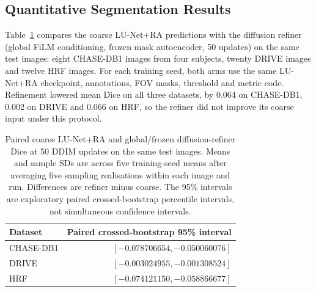 \documentclass[jimaging,article,submit,pdftex,moreauthors]
  {Definitions/mdpi}
\newcommand{\revbegin}{\begingroup\color{blue}}
\newcommand{\revbegin}{\begingroup}
\newcommand{\revend}{\ifhmode\par\fi\endgroup}
\providecommand{\linelabel}[1]{}
\newcommand{\seclabel}[1]{\linelabel{rev:sec:#1}}
\begin{document}
\subsection{Quantitative Segmentation Results}
\label{sec:quantitative}
\seclabel{quantitative}

\revbegin{}Table~\ref{tab:segmentation_results} compares the coarse LU-Net+RA predictions with the diffusion refiner (global FiLM conditioning, frozen mask autoencoder, 50 updates) on the same test images: eight CHASE-DB1 images from four subjects, twenty DRIVE images and twelve HRF images. For each training seed, both arms use the same LU-Net+RA checkpoint, annotations, FOV masks, threshold and metric code. Refinement lowered mean Dice on all three datasets, by 0.064 on CHASE-DB1, 0.002 on DRIVE and 0.066 on HRF, so the refiner did not improve its coarse input under this protocol.

\begin{table}[htbp]\revbegin{}
\centering
\caption{Paired coarse LU-Net+RA and global/frozen diffusion-refiner Dice at 50 DDIM updates on the same test images. Means and sample SDs are across five training-seed means after averaging five sampling realisations within each image and run. Differences are refiner minus coarse. The 95\% intervals are exploratory paired crossed-bootstrap percentile intervals, not simultaneous confidence intervals.}
\label{tab:segmentation_results}
\small
{}
\par\medskip
\begin{tabular}{lr}
\toprule
Dataset & Paired crossed-bootstrap 95\% interval \\
\midrule
CHASE-DB1 & $[-0.078706654,-0.050060076]$ \\
DRIVE & $[-0.003024955,-0.001308524]$ \\
HRF & $[-0.074121150,-0.058866677]$ \\
\bottomrule
\end{tabular}
\revend{}\end{table}
\end{document}
